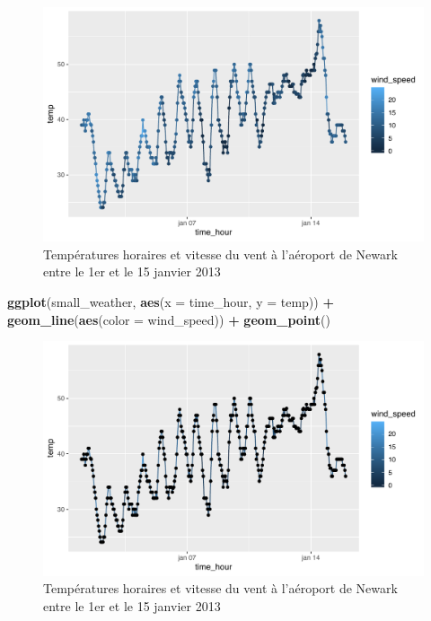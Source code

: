 \documentclass[a4paperpaper,]{article}
\newenvironment{Shaded}{\begin{snugshade}}{\end{snugshade}}
\newcommand{\KeywordTok}[1]{\textcolor[rgb]{0.13,0.29,0.53}{\textbf{#1}}}
\newcommand{\DataTypeTok}[1]{\textcolor[rgb]{0.13,0.29,0.53}{#1}}
\newcommand{\StringTok}[1]{\textcolor[rgb]{0.31,0.60,0.02}{#1}}
\newcommand{\OperatorTok}[1]{\textcolor[rgb]{0.81,0.36,0.00}{\textbf{#1}}}
\newcommand{\NormalTok}[1]{#1}
\theoremstyle{definition}
\theoremstyle{definition}
\theoremstyle{definition}
\theoremstyle{remark}
\begin{document}
\begin{figure}[htpb]

{\centering \includegraphics[width=0.9\linewidth]{figure/wind-1} 

}

\caption{Températures horaires et vitesse du vent à l'aéroport de Newark entre le 1er et le 15 janvier 2013}\label{fig:wind}
\end{figure}

\begin{Shaded}
\begin{Highlighting}[]
\KeywordTok{ggplot}\NormalTok{(small_weather, }\KeywordTok{aes}\NormalTok{(}\DataTypeTok{x =}\NormalTok{ time_hour, }\DataTypeTok{y =}\NormalTok{ temp)) }\OperatorTok{+}
\StringTok{  }\KeywordTok{geom_line}\NormalTok{(}\KeywordTok{aes}\NormalTok{(}\DataTypeTok{color =}\NormalTok{ wind_speed)) }\OperatorTok{+}
\StringTok{  }\KeywordTok{geom_point}\NormalTok{()}
\end{Highlighting}
\end{Shaded}

\begin{figure}[htpb]

{\centering \includegraphics[width=0.9\linewidth]{figure/wind2-1} 

}

\caption{Températures horaires et vitesse du vent à l'aéroport de Newark entre le 1er et le 15 janvier 2013}\label{fig:wind2}
\end{figure}
\end{document}
